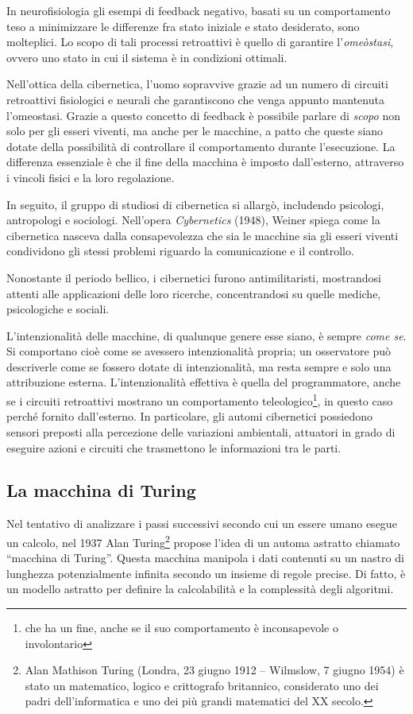 In neurofisiologia gli esempi di feedback negativo, basati su un comportamento teso a minimizzare le differenze fra stato iniziale e stato desiderato, sono molteplici. Lo scopo di tali processi retroattivi è quello di garantire l'\emph{omeòstasi}, ovvero uno stato in cui il sistema è in condizioni ottimali.

Nell'ottica della cibernetica, l'uomo sopravvive grazie ad un numero di circuiti retroattivi fisiologici e neurali che garantiscono che venga appunto mantenuta l'omeostasi. Grazie a questo concetto di feedback è possibile parlare di \emph{scopo} non solo per gli esseri viventi, ma anche per le macchine, a patto che queste siano dotate della possibilità di controllare il comportamento durante l'esecuzione. La differenza essenziale è che il fine della macchina è imposto dall'esterno, attraverso i vincoli fisici e la loro regolazione.

In seguito, il gruppo di studiosi di cibernetica si allargò, includendo psicologi, antropologi e sociologi. Nell'opera \emph{Cybernetics} (1948), Weiner spiega come la cibernetica nasceva dalla consapevolezza che sia le macchine sia gli esseri viventi condividono gli stessi problemi riguardo la comunicazione e il controllo.

Nonostante il periodo bellico, i cibernetici furono antimilitaristi, mostrandosi attenti alle applicazioni delle loro ricerche, concentrandosi su quelle mediche, psicologiche e sociali.

L'intenzionalità delle macchine, di qualunque genere esse siano, è sempre \emph{come se}. Si comportano cioè come se avessero intenzionalità propria; un osservatore può descriverle come se fossero dotate di intenzionalità, ma resta sempre e solo una attribuzione esterna. L'intenzionalità effettiva è quella del programmatore, anche se i circuiti retroattivi mostrano un comportamento teleologico\footnote{che ha un fine, anche se il suo comportamento è inconsapevole o involontario}, in questo caso perché fornito dall'esterno. In particolare, gli automi cibernetici possiedono sensori preposti alla percezione delle variazioni ambientali, attuatori in grado di eseguire azioni e circuiti che trasmettono le informazioni tra le parti.

\subsection{La macchina di Turing}
Nel tentativo di analizzare i passi successivi secondo cui un essere umano esegue un calcolo, nel 1937 Alan Turing\footnote{Alan Mathison Turing (Londra, 23 giugno 1912 – Wilmslow, 7 giugno 1954) è stato un matematico, logico e crittografo britannico, considerato uno dei padri dell'informatica e uno dei più grandi matematici del XX secolo.} propose l'idea di un automa astratto chiamato ``macchina di Turing''. Questa macchina manipola i dati contenuti su un nastro di lunghezza potenzialmente infinita secondo un insieme di regole precise. Di fatto, è un modello astratto per definire la calcolabilità e la complessità degli algoritmi.

